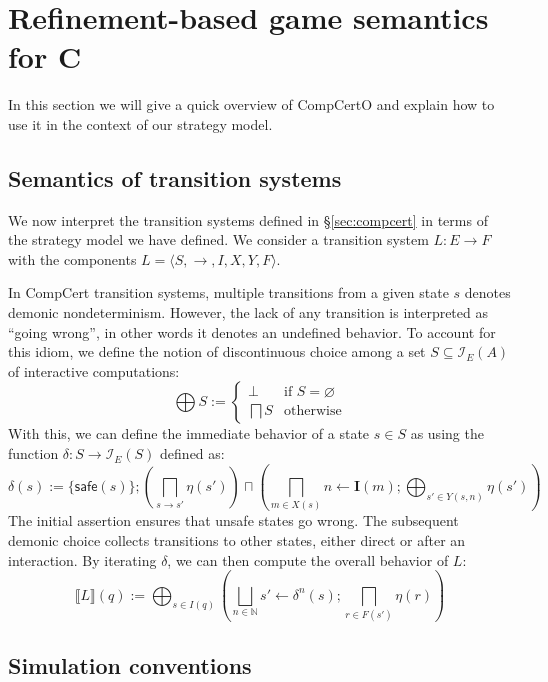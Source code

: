\documentclass[format=sigplan,authordraft]{acmart}
\newcommand{\kw}[1]{\ensuremath{\mathsf{#1}}}
\begin{document}


\section{Refinement-based game semantics for C} %

In this section we will give a quick overview of CompCertO
and explain how to use it in the context of our strategy model.

\subsection{Semantics of transition systems} %

We now interpret the transition systems defined in \S\ref{sec:compcert}
in terms of the strategy model we have defined.
We consider a transition system $L : E \rightarrow F$
with the components $L = \langle S, {\rightarrow}, I, X, Y, F \rangle$.

In CompCert transition systems,
multiple transitions from a given state $s$
denotes demonic nondeterminism.
However,
the lack of any transition is interpreted as ``going wrong'',
in other words it denotes an undefined behavior.
To account for this idiom,
we define the notion of discontinuous choice among
a set $S \subseteq \mathcal{I}_E(A)$ of interactive computations:
\[
    \bigoplus S :=
    \begin{cases}
      \bot & \mbox{if } S = \varnothing \\
      \bigsqcap S & \mbox{otherwise}
    \end{cases}
\]
With this,
we can define the immediate behavior of a state $s \in S$ as
using the function $\delta : S \rightarrow \mathcal{I}_E(S)$
defined as:
\[
  \delta(s) :=
    \{ \kw{safe}(s) \} ;
    \left( \bigsqcap_{s \rightarrow s'} \eta(s') \right)
    \sqcap
    \left( \bigsqcap_{m \in X(s)} n \leftarrow \mathbf{I}(m) ;
            \bigoplus_{s' \in Y(s, n)} \eta(s') \right)
\]
The initial assertion ensures that unsafe states go wrong.
The subsequent demonic choice
collects transitions to other states,
either direct or after an interaction.
By iterating $\delta$, we can then compute the overall behavior of $L$:
\[
   \llbracket L \rrbracket (q) :=
     \bigoplus_{s \in I(q)}
     \left(
     \bigsqcup_{n \in \mathbb{N}}
     s' \leftarrow \delta^n(s) ; \bigsqcap_{r \in F(s')} \eta(r)
     \right)
\]


\subsection{Simulation conventions} %
\end{document}
